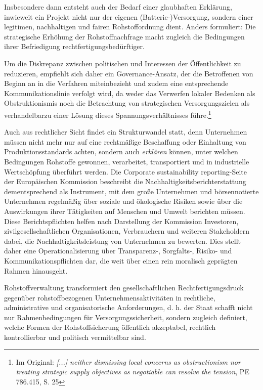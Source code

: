 \documentclass[12pt,a4paper,oneside]{book} %
\begin{document}
{ Insbesondere dann entsteht auch der Bedarf einer glaubhaften Erklärung, inwieweit ein Projekt nicht nur der eigenen (Batterie-)Versorgung, sondern einer legitimen, nachhaltigen und fairen Rohstoffordnung dient. Anders formuliert: Die strategische Erhöhung der Rohstoffnachfrage macht zugleich die Bedingungen ihrer Befriedigung rechtfertigungsbedürftiger.
 
 Um die Diskrepanz zwischen politischen und Interessen der Öffentlichkeit zu reduzieren, empfiehlt sich daher ein Governance-Ansatz, der die Betroffenen von Beginn an in die Verfahren miteinbezieht und zudem eine entsprechende Kommunikationslinie verfolgt wird, da \glqq weder das Verwerfen lokaler Bedenken als Obstruktionismis noch die Betrachtung von strategischen Versorgungszielen als verhandelbar\grqq zu einer Lösung dieses Spannungsverhältnisses führe.\footnote{Im Original: \glqq \textit{[...] neither dismissing local concerns as obstructionism nor treating strategic supply objectives as negotiable can resolve the tension}\grqq , PE 786.415, S. 25}

Auch aus rechtlicher Sicht findet ein Strukturwandel statt, denn Unternehmen müssen nicht mehr nur auf eine rechtmäßige Beschaffung oder Einhaltung von Produktionsstandards achten, sondern auch \textit{erklären} können, unter welchen Bedingungen Rohstoffe gewonnen, verarbeitet, transportiert und in industrielle Wertschöpfung überführt werden. Die Corporate sustainability reporting-Seite der Europäischen Kommission beschreibt die Nachhaltigkeitsberichterstattung dementsprechend als Instrument, mit dem große Unternehmen und börsennotierte Unternehmen regelmäßig über soziale und ökologische Risiken sowie über die Auswirkungen ihrer Tätigkeiten auf Menschen und Umwelt berichten müssen. Diese Berichtspflichten helfen nach Darstellung der Kommission Investoren, zivilgesellschaftlichen Organisationen, Verbrauchern und weiteren Stakeholdern dabei, die Nachhaltigkeitsleistung von Unternehmen zu bewerten. Dies stellt daher eine Operationalisierung über Transparenz-, Sorgfalts-, Risiko- und Kommunikationspflichten dar, die weit über einen rein moralisch geprägten Rahmen hinausgeht.

Rohstoffverwaltung transformiert den gesellschaftlichen Rechtfertigungsdruck gegenüber rohstoffbezogenen Unternehmensaktivitäten in rechtliche, administrative und organisatorische Anforderungen, d. h. der Staat schafft nicht nur Rahmenbedingungen für Versorgungssicherheit, sondern zugleich definiert, welche Formen der Rohstoffsicherung öffentlich akzeptabel, rechtlich kontrollierbar und politisch vermittelbar sind.

}
\end{document}
